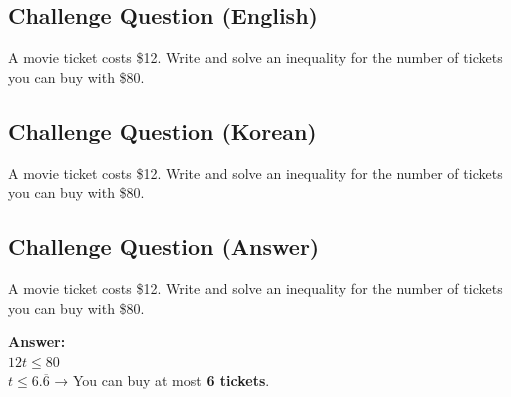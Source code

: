 \cleardoublepage
\subsection*{Challenge Question (English)}
A movie ticket costs \$12. Write and solve an inequality for the number of tickets you can buy with \$80.


\newpage
\subsection*{Challenge Question (Korean)}
A movie ticket costs \$12. Write and solve an inequality for the number of tickets you can buy with \$80.


\newpage
\subsection*{Challenge Question (Answer)}
A movie ticket costs \$12. Write and solve an inequality for the number of tickets you can buy with \$80.

\textbf{Answer:}\\
$12t \leq 80$\\
$t \leq 6.\overline{6}$ → You can buy at most \textbf{6 tickets}.
